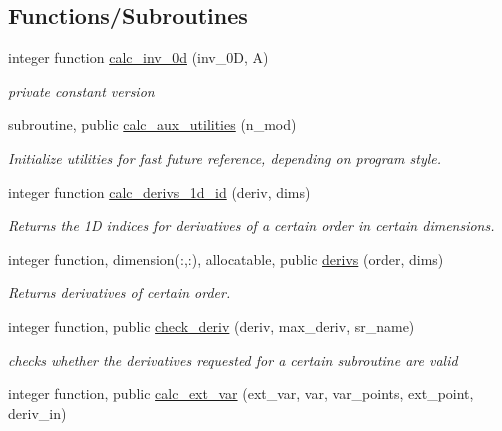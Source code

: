 \subsection*{Functions/\+Subroutines}
\begin{DoxyCompactItemize}
\item 
integer function \hyperlink{namespacenum__utilities_ac6699d422f3a588b51234c2d62ff389f}{calc\+\_\+inv\+\_\+0d} (inv\+\_\+0D, A)
\begin{DoxyCompactList}\small\item\em private constant version \end{DoxyCompactList}\item 
subroutine, public \hyperlink{namespacenum__utilities_af461ae4c95a7a45da875dcf311e323f5}{calc\+\_\+aux\+\_\+utilities} (n\+\_\+mod)
\begin{DoxyCompactList}\small\item\em Initialize utilities for fast future reference, depending on program style. \end{DoxyCompactList}\item 
integer function \hyperlink{namespacenum__utilities_af2e9ffd7ce2f9391bf8b6f1c344fabca}{calc\+\_\+derivs\+\_\+1d\+\_\+id} (deriv, dims)
\begin{DoxyCompactList}\small\item\em Returns the 1D indices for derivatives of a certain order in certain dimensions. \end{DoxyCompactList}\item 
integer function, dimension(\+:,\+:), allocatable, public \hyperlink{namespacenum__utilities_ac827c18dd05a9b5a06675eac942f3b51}{derivs} (order, dims)
\begin{DoxyCompactList}\small\item\em Returns derivatives of certain order. \end{DoxyCompactList}\item 
integer function, public \hyperlink{namespacenum__utilities_a00f4cfe18a734eaa5d66f529e52f7c31}{check\+\_\+deriv} (deriv, max\+\_\+deriv, sr\+\_\+name)
\begin{DoxyCompactList}\small\item\em checks whether the derivatives requested for a certain subroutine are valid \end{DoxyCompactList}\item 
integer function, public \hyperlink{namespacenum__utilities_a2d5d9c66db19fb6edeeb50db6182397f}{calc\+\_\+ext\+\_\+var} (ext\+\_\+var, var, var\+\_\+points, ext\+\_\+point, deriv\+\_\+in)

\end{DoxyCompactItemize}
